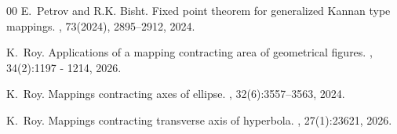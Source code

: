 \documentclass[11pt,reqno,a4paper]{amsart}
\theoremstyle{plain}
\theoremstyle{definition}
\theoremstyle{remark}
\numberwithin{equation}{section}
\begin{document}
\begin{thebibliography}{00}
E.~Petrov and R.K. Bisht.
\newblock Fixed point theorem for generalized {K}annan type mappings.
, 73(2024), 2895--2912, 2024.

K.~Roy.
\newblock Applications of a mapping contracting area of geometrical figures.
, 34(2):1197 - 1214, 2026.

K.~Roy.
\newblock Mappings contracting axes of ellipse.
, 32(6):3557--3563, 2024.

K.~Roy.
\newblock Mappings contracting transverse axis of hyperbola.
, 27(1):23621, 2026.
\end{thebibliography}
\end{document}
